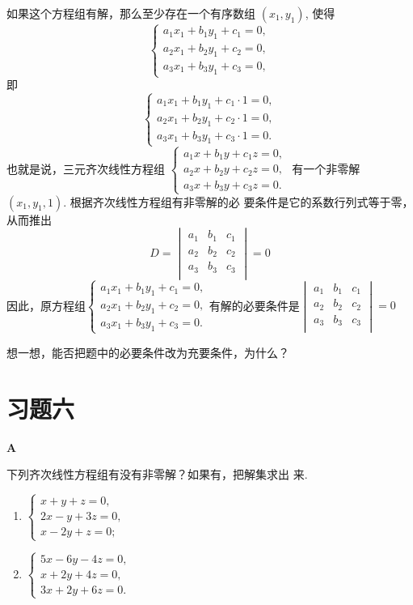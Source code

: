 \begin{solution}
如果这个方程组有解，那么至少存在一个有序数组
$(x_1,y_1)$, 使得
$$\begin{cases}a_1x_1+b_1y_1+c_1=0,\\a_2x_1+b_2y_1+c_2=0,\\a_3x_1+b_3y_1+c_3=0,\end{cases}$$
即
$$\begin{cases}a_1x_1+b_1y_1+c_1\cdot1=0,\\a_2x_1+b_2y_1+c_2\cdot1=0,\\a_3x_1+b_3y_1+c_3\cdot1=0.\end{cases}$$
也就是说，三元齐次线性方程组
$\begin{cases}a_1x+b_1y+c_1z=0,\\a_2x+b_2y+c_2z=0,\\a_3x+b_3y+c_3z=0.\end{cases}$
有一个非零解$(x_1,y_1,1)$. 根据齐次线性方程组有非零解的必
要条件是它的系数行列式等于零，从而推出
\[D=\begin{vmatrix}
  a_1&b_1&c_1\\
  a_2&b_2&c_2\\
  a_3&b_3&c_3\\
\end{vmatrix}=0\]
因此，原方程组$\begin{cases}
    a_1x_1+b_1y_1+c_1=0,\\
    a_2x_1+b_2y_1+c_2=0,\\
    a_3x_1+b_3y_1+c_3=0.
\end{cases}$有解的必要条件是$\begin{vmatrix}
  a_1&b_1&c_1\\
  a_2&b_2&c_2\\
  a_3&b_3&c_3\\
\end{vmatrix}=0$
\end{solution}

想一想，能否把题中的必要条件改为充要条件，为什么？

\section*{习题六}
\begin{center}
  \bfseries A
\end{center}

下列齐次线性方程组有没有非零解？如果有，把解集求出
来.
\begin{multicols}{2}
\begin{enumerate}[(1)]
  \item $\begin{cases}x+y+z=0,\\2x-y+3z=0,\\x-2y+z=0;\end{cases}$
  \item $\begin{cases}5x-6y-4z=0,\\x+2y+4z=0,\\3x+2y+6z=0.\end{cases}$
\end{enumerate}
\end{multicols}

